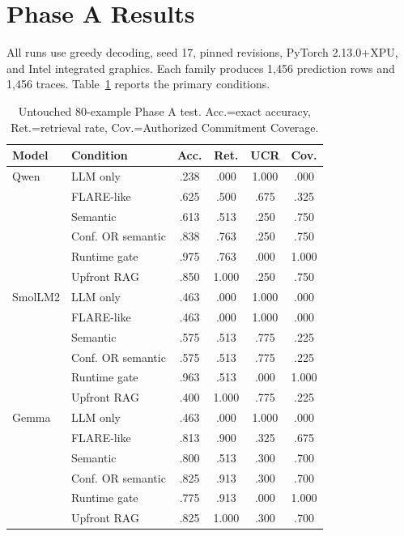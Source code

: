 \documentclass[11pt]{article}
\begin{document}
\section{Phase A Results}
All runs use greedy decoding, seed 17, pinned revisions, PyTorch 2.13.0+XPU, and
Intel integrated graphics. Each family produces 1,456 prediction rows and 1,456
traces. Table~\ref{tab:phase-a} reports the primary conditions.

\begin{table}[t]
\centering\scriptsize
\caption{Untouched 80-example Phase A test. Acc.=exact accuracy,
Ret.=retrieval rate, Cov.=Authorized Commitment Coverage.}
\label{tab:phase-a}
\begin{tabular}{@{}llcccc@{}}
\toprule
Model & Condition & Acc. & Ret. & UCR & Cov.\\
\midrule
Qwen & LLM only & .238 & .000 & 1.000 & .000\\
     & FLARE-like & .625 & .500 & .675 & .325\\
     & Semantic & .613 & .513 & .250 & .750\\
     & Conf. OR semantic & .838 & .763 & .250 & .750\\
     & Runtime gate & .975 & .763 & .000 & 1.000\\
     & Upfront RAG & .850 & 1.000 & .250 & .750\\
\midrule
SmolLM2 & LLM only & .463 & .000 & 1.000 & .000\\
        & FLARE-like & .463 & .000 & 1.000 & .000\\
        & Semantic & .575 & .513 & .775 & .225\\
        & Conf. OR semantic & .575 & .513 & .775 & .225\\
        & Runtime gate & .963 & .513 & .000 & 1.000\\
        & Upfront RAG & .400 & 1.000 & .775 & .225\\
\midrule
Gemma & LLM only & .463 & .000 & 1.000 & .000\\
      & FLARE-like & .813 & .900 & .325 & .675\\
      & Semantic & .800 & .513 & .300 & .700\\
      & Conf. OR semantic & .825 & .913 & .300 & .700\\
      & Runtime gate & .775 & .913 & .000 & 1.000\\
      & Upfront RAG & .825 & 1.000 & .300 & .700\\
\bottomrule
\end{tabular}
\end{table}
\end{document}
